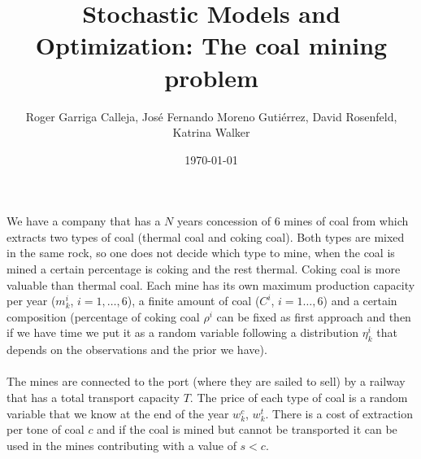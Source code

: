 \documentclass[11pt, english]{article}
\title{Stochastic Models and Optimization: The coal mining problem}
\author{Roger Garriga Calleja, José Fernando Moreno Gutiérrez, David Rosenfeld, Katrina Walker}
\date{\today}
\begin{document}
	\maketitle


We have a company that has a $N$ years concession of 6 mines of coal from which extracts two types of coal (thermal coal and coking coal). Both types are mixed in the same rock, so one does not decide which type to mine, when the coal is mined a certain percentage is coking and the rest thermal. Coking coal is more valuable than thermal coal. Each mine has its own maximum production capacity per year ($m_k^i$, $i=1,\dots,6$), a finite amount of coal ($C^i$, $i=1\dots,6$) and a certain composition (percentage of coking coal $\rho^i$ can be fixed as first approach and then if we have time we put it as a random variable following a distribution $\eta_k^i$ that depends on the observations and the prior we have). \\\\
The mines are connected to the port (where they are sailed to sell) by a railway that has a total transport capacity $T$. The price of each type of coal is a random variable that we know at the end of the year $w_k^c$, $w_k^t$. There is a cost of extraction per tone of coal $c$ and if the coal is mined but cannot be transported it can be used in the mines contributing with a value of $s<c$.\\\\
\end{document}
